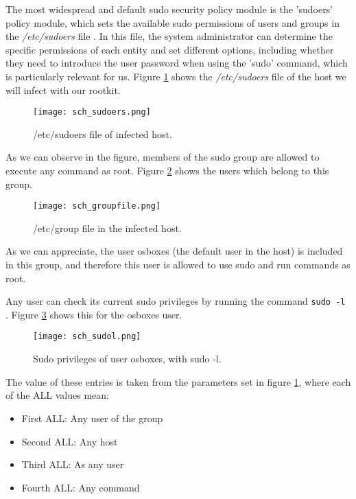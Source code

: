 The most widespread and default sudo security policy module is the 'sudoers' policy module, which sets the available sudo permissions of users and groups in the \textit{/etc/sudoers} file \cite{sudoers_man}. In this file, the system administrator can determine the specific permissions of each entity and set different options, including whether they need to introduce the user password when using the 'sudo' command, which is particularly relevant for us. Figure \ref{fig:sudoers} shows the \textit{/etc/sudoers} file of the host we will infect with our rootkit.

\begin{figure}[htbp]
	\centering
	\texttt{[image: sch\_sudoers.png]}
	\caption{/etc/sudoers file of infected host.}
	\label{fig:sudoers}
\end{figure}

As we can observe in the figure, members of the sudo group are allowed to execute any command as root. Figure \ref{fig:groupfile} shows the users which belong to this group.

\begin{figure}[htbp]
	\centering
	\texttt{[image: sch\_groupfile.png]}
	\caption{/etc/group file in the infected host.}
	\label{fig:groupfile}
\end{figure}

As we can appreciate, the user osboxes (the default user in the host) is included in this group, and therefore this user is allowed to use sudo and run commands as root.

Any user can check its current sudo privileges by running the command \lstinline{sudo -l} \lstinline{}. Figure \ref{fig:sudol} shows this for the osboxes user.

\begin{figure}[htbp]
	\centering
	\texttt{[image: sch\_sudol.png]}
	\caption{Sudo privileges of user osboxes, with sudo -l.}
	\label{fig:sudol}
\end{figure}

The value of these entries is taken from the parameters set in figure \ref{fig:sudoers}, where each of the ALL values mean:
\begin{itemize}
\item First ALL: Any user of the group
\item Second ALL: Any host
\item Third ALL: As any user
\item Fourth ALL: Any command
\end{itemize}

